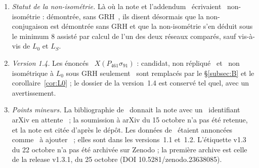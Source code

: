 \documentclass[11pt,a4paper]{amsart}
\theoremstyle{plain}
\theoremstyle{definition}
\newcommand{\Lz}{L_{0}}
\newcommand{\LS}{L_{S}}
\newcommand{\XB}{X(P_{461}\sigma_{91})}
\begin{document}
\begin{enumerate}[label=\textup{(\arabic*)}]
\item \emph{Statut de la non-isométrie.} Là où la note et l'addendum~\cite{Gau26a} écrivaient \guillemotleft~non-isométrie : démontrée, sans GRH~\guillemotright, ils disent désormais que la non-conjugaison est démontrée sans GRH et que la non-isométrie s'en déduit sous le minimum $8$ assisté par calcul de l'un des deux réseaux comparés, sauf vis-à-vis de $\Lz$ et $\LS$.
\item \emph{Version 1.4.} Les énoncés \guillemotleft~$\XB$ : candidat, non répliqué~\guillemotright{} et \guillemotleft~non isométrique à $\Lz$ sous GRH seulement~\guillemotright{} sont remplacés par le \S\ref{subsec:B} et le corollaire~\ref{cor:L0} ; le dossier de la version~1.4 est conservé tel quel, avec un avertissement.
\item \emph{Points mineurs.} La bibliographie de~\cite{Gau26a} donnait la note avec un \guillemotleft~identifiant arXiv en attente~\guillemotright{} ; la soumission à arXiv du 15 octobre n'a pas été retenue, et la note est citée d'après le dépôt. Les données de~\cite{Gau26a} étaient annoncées comme \guillemotleft~à ajouter~\guillemotright{} ; elles sont dans les versions~1.1 et~1.2. L'étiquette v1.3 du 22 octobre n'a pas été archivée sur Zenodo ; la première archive est celle de la release v1.3.1, du 25 octobre (DOI 10.5281/zenodo.23638085).
\end{enumerate}
\end{document}
